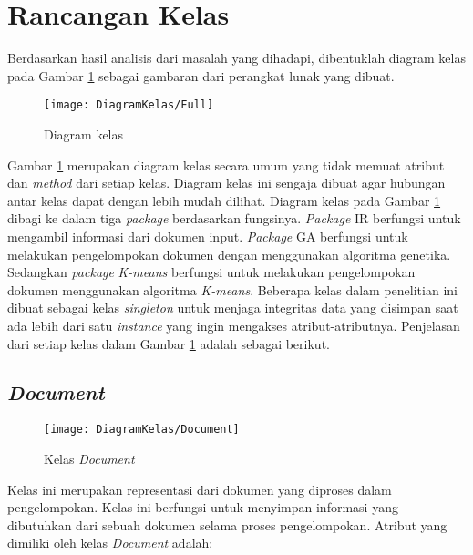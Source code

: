 \newpage
\section{Rancangan Kelas}
Berdasarkan hasil analisis dari masalah yang dihadapi, dibentuklah diagram kelas pada Gambar \ref{fig:diagramkelas} sebagai gambaran dari perangkat lunak yang dibuat.

\begin{figure}[H]
	\begin{center}
		\texttt{[image: DiagramKelas/Full]}
		\caption{Diagram kelas}
		\label{fig:diagramkelas}
	\end{center}
\end{figure}

Gambar \ref{fig:diagramkelas} merupakan diagram kelas secara umum yang tidak memuat atribut dan \textit{method} dari setiap kelas. Diagram kelas ini sengaja dibuat agar hubungan antar kelas dapat dengan lebih mudah dilihat. Diagram kelas pada Gambar \ref{fig:diagramkelas} dibagi ke dalam tiga \textit{package} berdasarkan fungsinya. \textit{Package} IR berfungsi untuk mengambil informasi dari dokumen input. \textit{Package} GA berfungsi untuk melakukan pengelompokan dokumen dengan menggunakan algoritma genetika. Sedangkan \textit{package} \textit{K-means} berfungsi untuk melakukan pengelompokan dokumen menggunakan algoritma \textit{K-means}. Beberapa kelas dalam penelitian ini dibuat sebagai kelas \textit{singleton} untuk menjaga integritas data yang disimpan saat ada lebih dari satu \textit{instance} yang ingin mengakses atribut-atributnya. Penjelasan dari setiap kelas dalam Gambar \ref{fig:diagramkelas} adalah sebagai berikut.

\subsection{\textit{Document}}

\begin{figure}[H]
	\begin{center}
		\texttt{[image: DiagramKelas/Document]}
		\caption{Kelas \textit{Document}}
		\label{fig:kelasDocument}
	\end{center}
\end{figure}

Kelas ini merupakan representasi dari dokumen yang diproses dalam pengelompokan. Kelas ini berfungsi untuk menyimpan informasi yang dibutuhkan dari sebuah dokumen selama proses pengelompokan. Atribut yang dimiliki oleh kelas \textit{Document} adalah:

